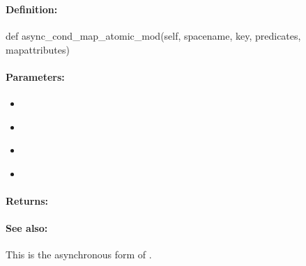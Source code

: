 \pagebreak
\subsubsection{}
\label{api:python:async_cond_map_atomic_mod}


\paragraph{Definition:}
\begin{pythoncode}
def async_cond_map_atomic_mod(self, spacename, key, predicates, mapattributes)
\end{pythoncode}

\paragraph{Parameters:}
\begin{itemize}[noitemsep]
\item {}\\

\item {}\\

\item {}\\

\item {}\\

\end{itemize}

\paragraph{Returns:}


\paragraph{See also:}  This is the asynchronous form of .

\pagebreak
\subsubsection{}
\label{api:python:map_atomic_and}


